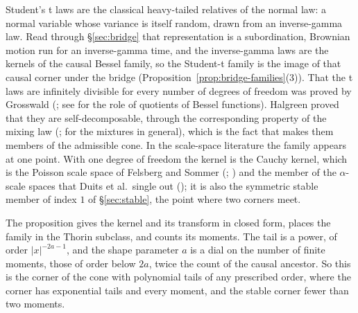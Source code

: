 Student's t laws are the classical heavy-tailed relatives of the normal law: a normal variable
whose variance is itself random, drawn from an inverse-gamma law. Read through \S\ref{sec:bridge}
that representation is a subordination, Brownian motion run for an inverse-gamma time, and the
inverse-gamma laws are the kernels of the causal Bessel family, so the Student-t family is the
image of that causal corner under the bridge (Proposition~\ref{prop:bridge-families}(3)).
That the t laws are infinitely divisible for every number of degrees of freedom was proved by
Grosswald (; see  for the role of
quotients of Bessel functions). Halgreen proved
that they are self-decomposable, through the corresponding property of the mixing law
(;  for the mixtures in general),
which is the fact that makes them members of the admissible cone. In the scale-space
literature the family appears at one point. With one degree of freedom the kernel is the Cauchy
kernel, which is the Poisson scale space of Felsberg and Sommer (;
) and the member of the $\alpha$-scale spaces that Duits et
al.\ single out (); it is also the symmetric stable member of index $1$
of \S\ref{sec:stable}, the point where two corners meet.

The proposition gives the kernel and its transform in closed form, places the family in the
Thorin subclass, and counts its moments. The tail is a power, of order $|x|^{-2a-1}$, and the
shape parameter $a$ is a dial on the number of finite moments, those of order below $2a$,
twice the count of the causal ancestor. So this is the corner of the cone with polynomial tails of any
prescribed order, where the \Matern{} corner has exponential tails and every moment, and the
stable corner fewer than two moments.


